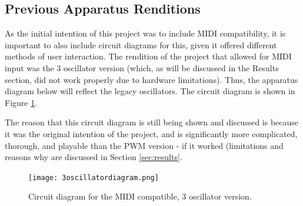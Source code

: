 \subsection{Previous Apparatus Renditions}\label{subsec:previous-apparatus-renditions}

As the initial intention of this project was to include MIDI compatibility, it is important to also include circuit diagrams for this, given it offered different methods of user interaction.
The rendition of the project that allowed for MIDI input was the 3 oscillator version (which, as will be discussed in the Results section, did not work properly due to hardware limitations).
Thus, the apparatus diagram below will reflect the legacy oscillators. The circuit diagram is shown in Figure \ref{fig:3oscillatordiagram}. 

The reason that this circuit diagram is still being shown and discussed is because it was the original intention of the project, and is significantly more complicated, thorough, and playable than the PWM version - if it worked (limitations and reasons why are discussed in Section \ref{sec:results}. 

\begin{figure}
    \centering
    \texttt{[image: 3oscillatordiagram.png]}
    \caption{Circuit diagram for the MIDI compatible, 3 oscillator version. }
    \label{fig:3oscillatordiagram}
\end{figure}